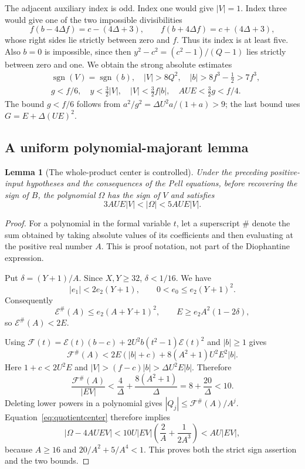 \documentclass[11pt]{article}
\newtheorem{lemma}[theorem]{Lemma}
\theoremstyle{remark}\newtheorem{remark}[theorem]{Remark}
\begin{document}
The adjacent auxiliary index is odd. Index one would give $|V|=1$.
Index three would give one of the two impossible divisibilities
\[
 f(b-4\Delta f)=c-(4\Delta+3),\qquad
 f(b+4\Delta f)=c+(4\Delta+3),
\]
whose right sides lie strictly between zero and $f$. Thus its index is
at least five. Also $b=0$ is impossible, since then
$y^2-c^2=(c^2-1)/(Q-1)$ lies strictly between zero and one.
We obtain the strong absolute estimates
\begin{align}
 &\operatorname{sgn}(V)=\operatorname{sgn}(b),\quad
 |V|>8Q^2,\quad |b|>8f^3-\tfrac12>7f^3,\label{eq:bstrong}\\
 &g<f/6,\quad y<\tfrac32|V|,\quad
 |V|<\tfrac32f|b|,\quad AUE<\tfrac32g<f/4.
 \label{eq:absolutebounds}
\end{align}
The bound $g<f/6$ follows from
$a^2/g^2=\Delta U^2a/(1+a)>9$; the last bound uses
$G=E+\Delta(UE)^2$.

\subsection{A uniform polynomial-majorant lemma}

\begin{lemma}[The whole-product center is controlled]\label{lem:centerbound}
Under the preceding positive-input hypotheses and the consequences of
the Pell equations, before recovering the sign of $B$, the polynomial
$\Omega$ has the sign of $V$ and satisfies
\[
 3AUE|V|<|\Omega|<5AUE|V|.
\]
\end{lemma}
\begin{proof}
For a polynomial in the formal variable $t$, let a superscript $\#$ denote
the sum obtained by taking absolute values of its coefficients and then
evaluating at the positive real number $A$. This is proof notation, not
part of the Diophantine expression.

Put $\delta=(Y+1)/A$. Since $X,Y\ge32$, $\delta<1/16$. We have
\[
 |e_1|<2e_2(Y+1),\qquad 0<e_0\le e_2(Y+1)^2.
\]
Consequently
\[
 \mathcal E^{\#}(A)\le e_2(A+Y+1)^2,
 \qquad E\ge e_2A^2(1-2\delta),
\]
so $\mathcal E^{\#}(A)<2E$.

Using
$\mathcal F(t)=\mathcal E(t)(b-c)+2U^2b(t^2-1)\mathcal E(t)^2$
and $|b|\ge1$ gives
\[
 \mathcal F^{\#}(A)
 <2E(|b|+c)+8(A^2+1)U^2E^2|b|.
\]
Here $1+c<2U^2E$ and
$|V|>(f-c)|b|>\Delta U^2E|b|$. Therefore
\begin{equation}\label{eq:majorant}
 \frac{\mathcal F^{\#}(A)}{|EV|}
 <\frac4\Delta+\frac{8(A^2+1)}\Delta
 =8+\frac{20}{\Delta}<10.
\end{equation}
Deleting lower powers in a polynomial gives
$|Q_j|\le\mathcal F^{\#}(A)/A^j$. Equation~\eqref{eq:quotientcenter}
therefore implies
\[
 |\Omega-4AUEV|
 <10U|EV|\left(\frac2A+\frac1{2A^3}\right)
 <AU|EV|,
\]
because $A\ge16$ and $20/A^2+5/A^4<1$. This proves both the strict
sign assertion and the two bounds.
\end{proof}
\end{document}
